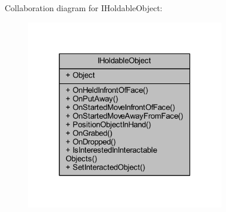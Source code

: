Collaboration diagram for I\+Holdable\+Object\+:\nopagebreak
\begin{figure}[H]
\begin{center}
\leavevmode
\includegraphics[width=247pt]{interface_i_holdable_object__coll__graph}
\end{center}
\end{figure}
